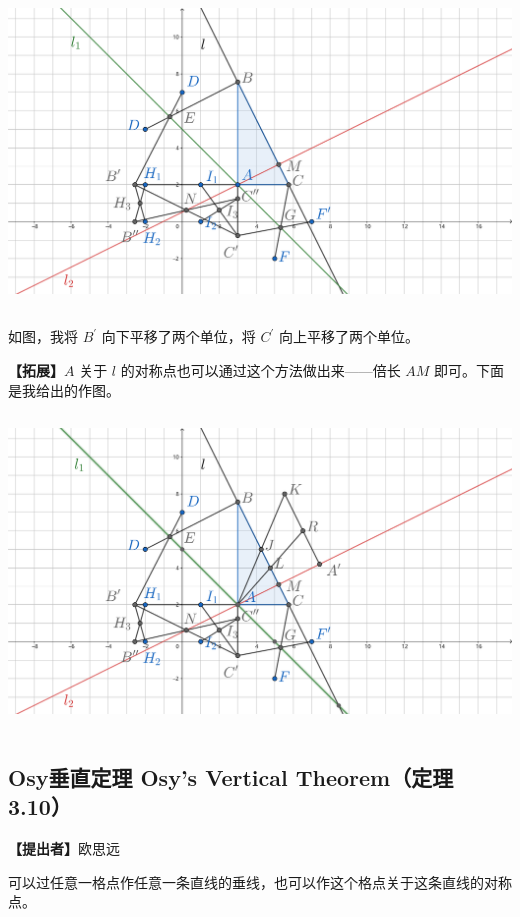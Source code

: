 \documentclass[UTF8]{article}
\begin{document}
\includegraphics[width=5.76806in,height=3.27847in]{media/image53.png}

如图，我将 \(B^{'}\) 向下平移了两个单位，将 \(C^{'}\)
向上平移了两个单位。

\textbf{【拓展】}\(A\) 关于 \(l\)
的对称点也可以通过这个方法做出来------倍长 \(AM\)
即可。下面是我给出的作图。

\includegraphics[width=5.76806in,height=3.27847in]{media/image54.png}

\hypertarget{osyux5782ux76f4ux5b9aux7406-osys-vertical-theoremux5b9aux7406-3.10}{%
\subsection{Osy垂直定理 Osy's Vertical Theorem（定理
3.10）}\label{osyux5782ux76f4ux5b9aux7406-osys-vertical-theoremux5b9aux7406-3.10}}

\textbf{【提出者】}欧思远

可以过任意一格点作任意一条直线的垂线，也可以作这个格点关于这条直线的对称点。
\end{document}

